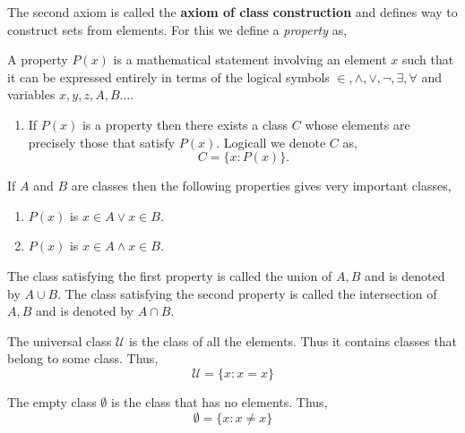 The second axiom is called the \textbf{axiom of class construction} and defines way to construct 
sets from elements. For this we define a \textit{property} as,
\begin{Definition}
    A property $P(x)$ is a mathematical statement involving an element $x$ such that it can be
    expressed entirely in terms of the logical symbols $\in, \land, \lor, \lnot, \exists, \forall$
    and variables $x,y,z,A,B \dots$. 
\end{Definition}

\begin{enumerate}[label=\bfseries Axiom 2:]
    \item If $P(x)$ is a property then there exists a class $C$ whose elements are precisely those
	that satisfy $P(x)$. Logicall we denote $C$ as,
	\begin{equation*}
	    C = \left.\lbrace x : P(x) \rbrace\right..
	\end{equation*}
\end{enumerate}

If $A$ and $B$ are classes then the following properties gives very important classes,
\begin{enumerate}
    \item $P(x)$ is $x \in A \lor x \in B$.
    \item $P(x)$ is $x \in A \land x \in B$.
\end{enumerate}

The class satisfying the first property is called the union of $A,B$ and is denoted by $A \cup B$.
The class satisfying the second property is called the intersection of $A,B$ and is denoted by 
$A \cap B$.

\begin{Definition}
    The universal class $\mathcal{U}$ is the class of all the elements. Thus it contains classes
    that belong to some class. Thus, 
    \begin{equation*}
	\mathcal{U} = \left.\lbrace x : x = x \rbrace\right.
    \end{equation*}
\end{Definition}

\begin{Definition}
    The empty class $\emptyset$ is the class that has no elements. Thus,
    \begin{equation*}
	\emptyset = \left.\lbrace x : x \neq x \rbrace\right.
    \end{equation*}
\end{Definition}

